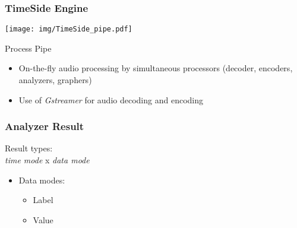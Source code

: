 \documentclass[10pt, final, hyperref, table]{beamer}
\begin{document}
\begin{frame}
  \frametitle{TimeSide Engine}
  \begin{center}
    \texttt{[image: img/TimeSide\_pipe.pdf]}
  \end{center}
  \begin{block}{Process Pipe}
    \begin{itemize}
    \item On-the-fly audio processing by simultaneous processors (decoder, encoders, analyzers, graphers)
    \item Use of \emph{Gstreamer} for audio decoding and encoding    \end{itemize}
  \end{block}
\end{frame}

\begin{frame}
  \frametitle{Analyzer Result}
  \begin{minipage}{0.4\linewidth}
    \begin{block}{Result types: \\\emph{time mode} x \emph{data mode}}
      \begin{itemize}
      \item Data modes:
        \begin{itemize}
        \item \alert<2-5>{Label}
        \item \alert<6-9>{Value}
        \end{itemize}


\end{itemize}
\end{block}
\end{minipage}
\end{frame}
\end{document}
